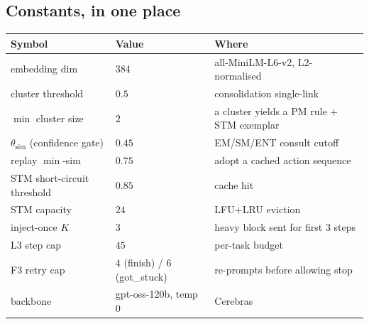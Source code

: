 \subsection{Constants, in one place}
\label{sec:gl-constants}
\begin{center}\small
\begin{tabular}{@{}lll@{}}
\toprule
Symbol & Value & Where \\
\midrule
embedding dim & 384 & all-MiniLM-L6-v2, L2-normalised \\
cluster threshold & $0.5$ & consolidation single-link \\
$\min$ cluster size & $2$ & a cluster yields a PM rule + STM exemplar \\
$\theta_{\text{sim}}$ (confidence gate) & $0.45$ & EM/SM/ENT consult cutoff \\
replay $\min$-sim & $0.75$ & adopt a cached action sequence \\
STM short-circuit threshold & $0.85$ & cache hit \\
STM capacity & $24$ & LFU$+$LRU eviction \\
inject-once $K$ & $3$ & heavy block sent for first 3 steps \\
L3 step cap & $45$ & per-task budget \\
F3 retry cap & $4$ (finish) / $6$ (got\_stuck) & re-prompts before allowing stop \\
backbone & gpt-oss-120b, temp $0$ & Cerebras \\
\bottomrule
\end{tabular}
\end{center}
